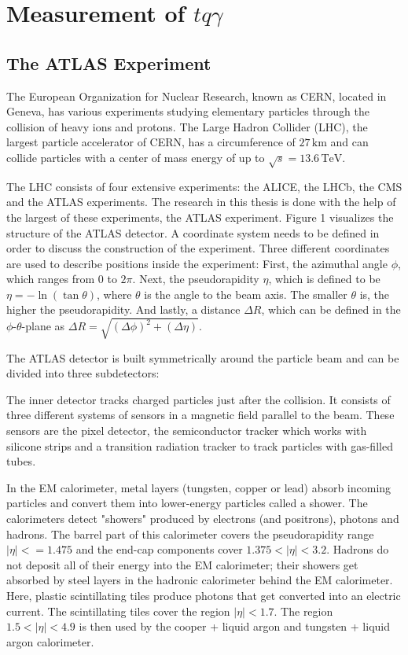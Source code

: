 


\chapter{Measurement of \texorpdfstring{$tq\gamma$}{tqGamma}}
\label{chap:measurement}

\section{The ATLAS Experiment}
\label{sec:atlas}
The European Organization for Nuclear Research, known as CERN, located in Geneva, has various experiments studying elementary particles through the collision of heavy ions and protons. 
The Large Hadron Collider (LHC), the largest particle accelerator of CERN, has a circumference of $27 \,\si{\kilo\metre}$ and can collide particles with a center of mass energy of up to $\sqrt{s} = 13.6 \,\si{\tera\electronvolt}$. 


The LHC consists of four extensive experiments: the ALICE, the LHCb, the CMS and the ATLAS experiments. The research in this thesis is done with the help of the largest of these experiments, the ATLAS experiment. Figure 1 visualizes the structure of the ATLAS detector. 
A coordinate system needs to be defined in order to discuss the construction of the experiment. Three different coordinates are used to describe positions inside the experiment: First, the azimuthal angle $\phi$, which ranges from $0$ to $2\pi$. 
Next, the pseudorapidity $\eta$, which is defined to be $\eta = -\ln(\tan \theta)$, where $\theta$ is the angle to the beam axis. The smaller $\theta$ is, the higher the pseudorapidity. And lastly, a distance $\Delta R$, which can be defined in the $\phi$-$\theta$-plane as $\Delta R = \sqrt{(\Delta \phi)^2 +(\Delta \eta)}$.

The ATLAS detector is built symmetrically around the particle beam and can be divided into three subdetectors:

The inner detector tracks charged particles just after the collision. 
It consists of three different systems of sensors in a magnetic field parallel to the beam. 
These sensors are the pixel detector, the semiconductor tracker which works with silicone strips and a transition radiation tracker to track particles with gas-filled tubes. 

In the EM calorimeter, metal layers (tungsten, copper or lead) absorb incoming particles and convert them into lower-energy particles called a shower. The calorimeters detect "showers" produced by electrons (and positrons), photons and hadrons. The barrel part of this calorimeter covers the pseudorapidity range $|\eta| < = 1.475$ and the end-cap components cover $1.375 <|\eta|< 3.2$.
Hadrons do not deposit all of their energy into the EM calorimeter; their showers get absorbed by steel layers in the hadronic calorimeter behind the EM calorimeter. 
Here, plastic scintillating tiles produce photons that get converted into an electric current. The scintillating tiles cover the region $|\eta| < 1.7$. The region $1.5 < |\eta| < 4.9$ is then used by the cooper + liquid argon and tungsten + liquid argon calorimeter.

